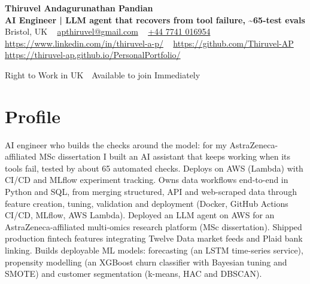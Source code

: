 \documentclass[a4paper,11pt]{article}
\begin{document}
\begin{center}
  {\LARGE\bfseries Thiruvel Andagurunathan Pandian} \\[3pt]
  {\color{headernavy}\small\textbf{AI Engineer | LLM agent that recovers from tool failure, \textasciitilde{}65-test evals}} \\[3pt]
  {\small
  Bristol, UK\nobreak\ \,\textbar\, \href{mailto:apthiruvel@gmail.com}{apthiruvel@gmail.com}\nobreak\ \,\textbar\, \href{tel:+447741016954}{+44 7741 016954}\nobreak\ \,\textbar\, \href{https://www.linkedin.com/in/thiruvel-a-p/}{https://www.linkedin.com/in/thiruvel-a-p/}\nobreak\ \,\textbar\, \href{https://github.com/Thiruvel-AP}{https://github.com/Thiruvel-AP}\nobreak\ \,\textbar\, \href{https://thiruvel-ap.github.io/PersonalPortfolio/}{https://thiruvel-ap.github.io/PersonalPortfolio/}}\par\vspace{4pt}
  \noindent{} Right to Work in UK \,\textbar\, Available to join Immediately
\end{center}

\section{Profile}
AI engineer who builds the checks around the model: for my AstraZeneca-affiliated MSc dissertation I built an AI assistant that keeps working when its tools fail, tested by about 65 automated checks. Deploys on AWS (Lambda) with CI/CD and MLflow experiment tracking. Owns data workflows end-to-end in Python and SQL, from merging structured, API and web-scraped data through feature creation, tuning, validation and deployment (Docker, GitHub Actions CI/CD, MLflow, AWS Lambda). Deployed an LLM agent on AWS for an AstraZeneca-affiliated multi-omics research platform (MSc dissertation). Shipped production fintech features integrating Twelve Data market feeds and Plaid bank linking. Builds deployable ML models: forecasting (an LSTM time-series service), propensity modelling (an XGBoost churn classifier with Bayesian tuning and SMOTE) and customer segmentation (k-means, HAC and DBSCAN).
\end{document}
